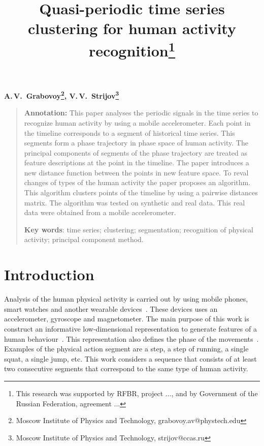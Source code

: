 \documentclass[12pt, twoside]{article}
\numberwithin{equation}{section}
\begin{document}
\title{\bf Quasi-periodic time series clustering for human activity recognition\thanks{This research was supported by RFBR, project ..., and by Government of the Russian Federation, agreement ...}}
\date{}
\author{}
\maketitle

\begin{center}
\bf
A.\,V.~Grabovoy\footnote{Moscow Institute of Physics and Technology, grabovoy.av@phystech.edu}, V.\,V.~Strijov\footnote{Moscow Institute of Physics and Technology, strijov@ccas.ru}

\end{center}

{\centering\begin{quote}
\textbf{Annotation:} This paper analyses the periodic signals in the time series to recognize human activity by using a mobile accelerometer. 
Each point in the timeline corresponds to a segment of historical time series. This segments form a phase trajectory in phase space of human activity.
The principal components of segments of the phase trajectory are treated as feature descriptions at the point in the timeline.
The paper introduces a new distance function between the points in new feature space.
To reval changes of types of the human activity the paper proposes an algorithm. This algorithm clusters points of the timeline by using a pairwise distances matrix.
The algorithm was tested on synthetic and real data. This real data were obtained from a mobile accelerometer.


\smallskip
\textbf{Key words}: time series; clustering; segmentation; recognition of physical activity; principal component method.

\smallskip
\end{quote}
}

\section{Introduction}
Analysis of the human physical activity is carried out by using mobile phones, smart watches and another wearable devices~\cite{kwapisz2010, wang2014}.
These devices uses an accelerometer, gyroscope and magnetometer. 
The main purpose of this work is construct an informative low-dimensional representation to generate features of a human behaviour~\cite{Ignatov2015, Olivares2012}. This representation also defines the phase of the movements~\cite{motrenko2015, cinar2018}.
Examples of the physical action segment are a step, a step of running, a single squat, a single jump, etc.
This work considers a sequence that consists of at least two consecutive segments that correspond to the same type of human activity.
\end{document}
